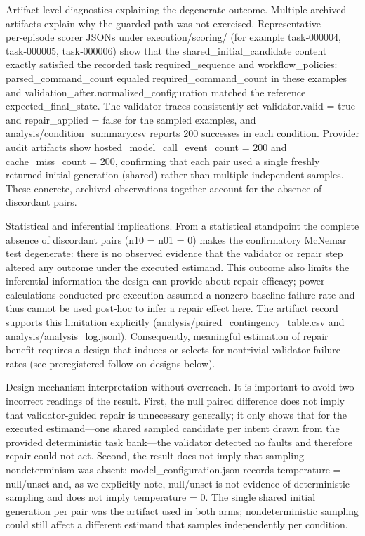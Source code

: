 \documentclass[conference]{IEEEtran}
\begin{document}
Artifact‑level diagnostics explaining the degenerate outcome. Multiple archived artifacts explain why the guarded path was not exercised. Representative per‑episode scorer JSONs under execution/scoring/ (for example task‑000004, task‑000005, task‑000006) show that the shared\_initial\_candidate content exactly satisfied the recorded task required\_sequence and workflow\_policies: parsed\_command\_count equaled required\_command\_count in these examples and validation\_after.normalized\_configuration matched the reference expected\_final\_state. The validator traces consistently set validator.valid = true and repair\_applied = false for the sampled examples, and analysis/condition\_summary.csv reports 200 successes in each condition. Provider audit artifacts show hosted\_model\_call\_event\_count = 200 and cache\_miss\_count = 200, confirming that each pair used a single freshly returned initial generation (shared) rather than multiple independent samples. These concrete, archived observations together account for the absence of discordant pairs.

Statistical and inferential implications. From a statistical standpoint the complete absence of discordant pairs (n10 = n01 = 0) makes the confirmatory McNemar test degenerate: there is no observed evidence that the validator or repair step altered any outcome under the executed estimand. This outcome also limits the inferential information the design can provide about repair efficacy; power calculations conducted pre‑execution assumed a nonzero baseline failure rate and thus cannot be used post‑hoc to infer a repair effect here. The artifact record supports this limitation explicitly (analysis/paired\_contingency\_table.csv and analysis/analysis\_log.jsonl). Consequently, meaningful estimation of repair benefit requires a design that induces or selects for nontrivial validator failure rates (see preregistered follow‑on designs below).

Design‑mechanism interpretation without overreach. It is important to avoid two incorrect readings of the result. First, the null paired difference does not imply that validator‑guided repair is unnecessary generally; it only shows that for the executed estimand---one shared sampled candidate per intent drawn from the provided deterministic task bank---the validator detected no faults and therefore repair could not act. Second, the result does not imply that sampling nondeterminism was absent: model\_configuration.json records temperature = null/unset and, as we explicitly note, null/unset is not evidence of deterministic sampling and does not imply temperature = 0. The single shared initial generation per pair was the artifact used in both arms; nondeterministic sampling could still affect a different estimand that samples independently per condition.
\end{document}
